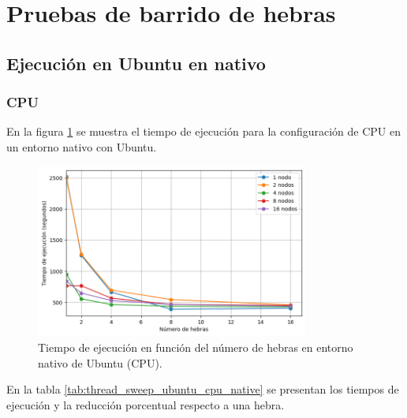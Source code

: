 \section{Pruebas de barrido de hebras}
\subsection{Ejecución en Ubuntu en nativo}
\subsubsection{CPU}

En la figura \ref{fig:thread_sweep_ubuntu_cpu_native_time} se muestra el tiempo de ejecución para la configuración de CPU en un entorno nativo con Ubuntu.

\begin{figure}[H]
    \centering
    \includegraphics[width=0.8\textwidth]{imagenes/cap5/thread_sweep_ubuntu_cpu_native_time.png}
    \caption{Tiempo de ejecución en función del número de hebras en entorno nativo de Ubuntu (CPU).}
    \label{fig:thread_sweep_ubuntu_cpu_native_time}
\end{figure}

En la tabla \ref{tab:thread_sweep_ubuntu_cpu_native} se presentan los tiempos de ejecución y la reducción porcentual respecto a una hebra.

